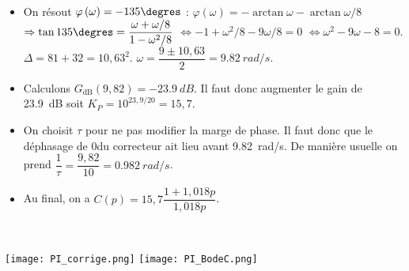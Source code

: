 \ifprof
\begin{corrige}~\\

\begin{itemize}
\item On résout $\varphi\left(\omega\right)=-135\degres$ : 
$\varphi\left(\omega\right)=-\arctan \omega-\arctan \omega/8 $ $\Rightarrow \tan 135\degres = \dfrac{\omega+\omega/8}{1-\omega^2/8}$ 
$\Leftrightarrow - 1+\omega^2/8-9\omega/8=0$ 
$\Leftrightarrow  \omega^2 -9\omega-8 =0$. 
$\Delta = 81+32=10,63^2$. 
$\omega = \dfrac{9\pm10,63}{2}=\SI{9,82}{rad/s}$.


\item Calculons $G_{\text{dB}}(9,82)=\SI{-23,9}{dB}$. Il faut donc augmenter le gain de \SI{23,9}{dB} soit $K_P=10^{23,9/20}=15,7$.

\item On choisit $\tau$ pour ne pas modifier la marge de phase. Il faut donc que le déphasage de 0\degres du correcteur ait lieu  avant \SI{9,82}{rad/s}. De manière usuelle on prend $\dfrac{1}{\tau}=\dfrac{9,82}{10}=\SI{0,982}{rad/s}$.

\item Au final, on a $C(p)=15,7\dfrac{1+1,018p}{1,018p}$.
\end{itemize}

\end{corrige}
\else\fi


\ifprof
\begin{corrige}~\\
\begin{center}
\texttt{[image: PI\_corrige.png]}
\texttt{[image: PI\_BodeC.png]}
\end{center}
\end{corrige}
\else
\fi


\ifcolle
\else
\ifprof
\else
{}
\fi
\fi



